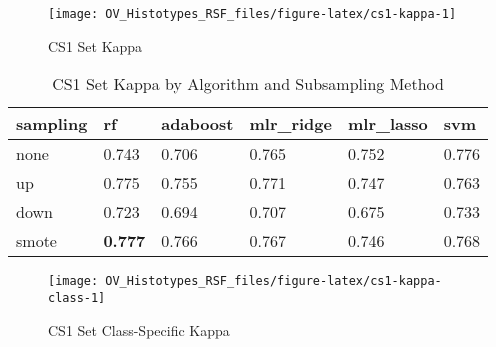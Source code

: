 \documentclass[
]{report}
\begin{document}
\begin{figure}[H]

{\centering \texttt{[image: OV\_Histotypes\_RSF\_files/figure-latex/cs1-kappa-1]} 

}

\caption{CS1 Set Kappa}\label{fig:cs1-kappa}
\end{figure}

\begin{table}

\caption{\label{tab:cs1-kappa-table}CS1 Set Kappa by Algorithm and Subsampling Method}
\centering
\begin{tabular}[t]{l|l|l|l|l|l}
\hline
sampling & rf & adaboost & mlr\_ridge & mlr\_lasso & svm\\
\hline
none & 0.743 & 0.706 & 0.765 & 0.752 & 0.776\\
\hline
up & 0.775 & 0.755 & 0.771 & 0.747 & 0.763\\
\hline
down & 0.723 & 0.694 & 0.707 & 0.675 & 0.733\\
\hline
smote & \textbf{0.777} & 0.766 & 0.767 & 0.746 & 0.768\\
\hline
\end{tabular}
\end{table}

\begin{figure}[H]

{\centering \texttt{[image: OV\_Histotypes\_RSF\_files/figure-latex/cs1-kappa-class-1]} 

}

\caption{CS1 Set Class-Specific Kappa}\label{fig:cs1-kappa-class}
\end{figure}
\end{document}
